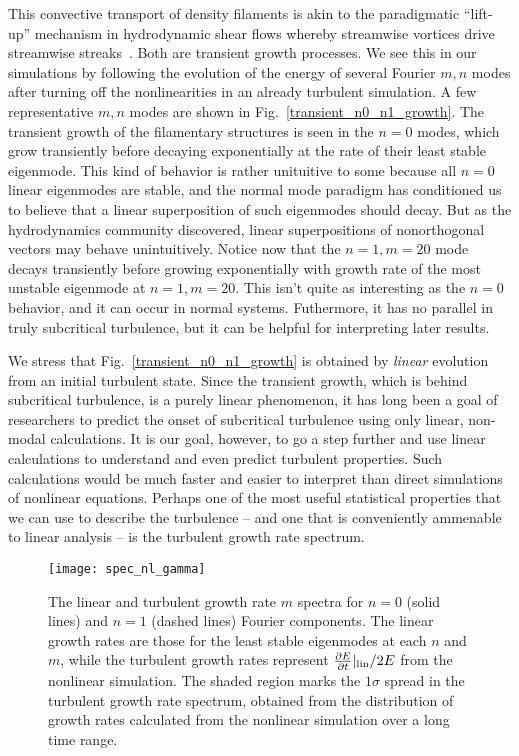 \documentclass[showpacs,preprintnumbers,amsmath,amssymb,superscriptaddress,aip]{revtex4-1}
\newcommand{\pdiff}[2]{\frac{\partial#1}{\partial#2}}
\begin{document}
This convective transport of density filaments is akin to the paradigmatic ``lift-up'' mechanism in hydrodynamic shear flows whereby streamwise vortices drive streamwise streaks~\cite{krommes1999}.
Both are transient growth processes. We see this in our simulations by following the evolution of the energy of several Fourier $m,n$ modes after turning off the nonlinearities in an already
turbulent simulation. A few representative $m,n$ modes are shown in Fig.~\ref{transient_n0_n1_growth}. The transient growth of the filamentary structures is seen in the $n=0$ modes, 
which grow transiently before decaying exponentially at the rate of their least stable eigenmode. This kind of behavior is rather unituitive to some because all $n=0$ linear eigenmodes are stable, 
and the normal mode paradigm has conditioned us to believe that a linear superposition of such eigenmodes should decay. But as the hydrodynamics community discovered, linear
superpositions of nonorthogonal vectors may behave unintuitively.
Notice now that the $n=1,m=20$ mode decays transiently before growing exponentially with growth rate of the most unstable eigenmode at $n=1,m=20$. This isn't quite as interesting as the $n=0$
behavior, and it can occur in normal systems. Futhermore, it has no parallel in truly subcritical turbulence, but it can be helpful for interpreting later results.

We stress that Fig.~\ref{transient_n0_n1_growth} is obtained by \emph{linear} evolution from an initial turbulent state.
Since the transient growth, which is behind subcritical turbulence, is a purely linear phenomenon, it has long been a goal of researchers to predict the onset of subcritical turbulence using
only linear, non-modal calculations. It is our goal, however, to go a step further and use linear calculations to understand and even predict turbulent properties.
Such calculations would be much faster and easier to interpret than direct simulations of nonlinear equations. Perhaps one of the most useful statistical properties that we can use to describe
the turbulence -- and one that is conveniently ammenable to linear analysis -- is the turbulent growth rate spectrum.

\begin{figure}
\centerline{\texttt{[image: spec\_nl\_gamma]}}
\caption{The linear and turbulent growth rate $m$ spectra for $n=0$ (solid lines) and $n=1$ (dashed lines) Fourier components. The linear growth rates are those for the least stable eigenmodes at each
$n$ and $m$, while the turbulent growth rates represent $\pdiff{E}{t}|_{\rm{lin}}/2 E$ from the nonlinear simulation. The shaded region marks the $1 \sigma$ spread in the turbulent growth rate spectrum,
obtained from the distribution of growth rates calculated from the nonlinear simulation over a long time range.}
\label{spec_nl_gamma}
\end{figure}
\end{document}
